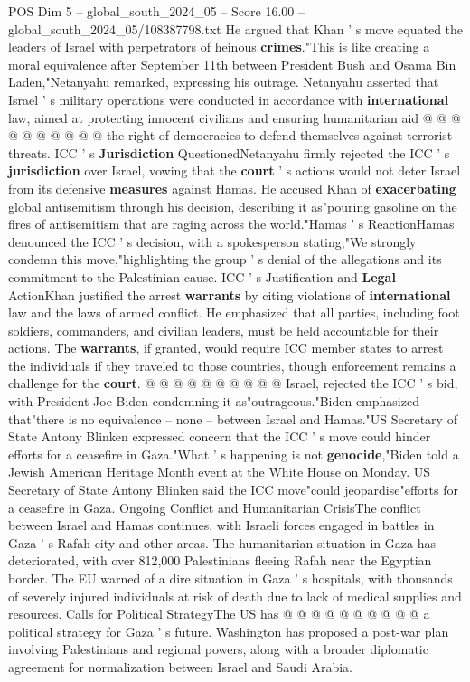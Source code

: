 \begin{textsample}{POS Dim 5 – global\_south\_2024\_05 – Score 16.00 – global\_south\_2024\_05/108387798.txt}
He argued that Khan ' s move equated the leaders of Israel with perpetrators of heinous \textbf{crimes}."This is like creating a moral equivalence after September 11th between President Bush and Osama Bin Laden,"Netanyahu remarked, expressing his outrage.
Netanyahu asserted that Israel ' s military operations were conducted in accordance with \textbf{international} law, aimed at protecting innocent civilians and ensuring humanitarian aid @ @ @ @ @ @ @ @ @ @ the right of democracies to defend themselves against terrorist threats.
ICC ' s \textbf{Jurisdiction} QuestionedNetanyahu firmly rejected the ICC ' s \textbf{jurisdiction} over Israel, vowing that the \textbf{court} ' s actions would not deter Israel from its defensive \textbf{measures} against Hamas.
He accused Khan of \textbf{exacerbating} global antisemitism through his decision, describing it as"pouring gasoline on the fires of antisemitism that are raging across the world."Hamas ' s ReactionHamas denounced the ICC ' s decision, with a spokesperson stating,"We strongly condemn this move,"highlighting the group ' s denial of the allegations and its commitment to the Palestinian cause.
ICC ' s Justification and \textbf{Legal} ActionKhan justified the arrest \textbf{warrants} by citing violations of \textbf{international} law and the laws of armed conflict.
He emphasized that all parties, including foot soldiers, commanders, and civilian leaders, must be held accountable for their actions.
The \textbf{warrants}, if granted, would require ICC member states to arrest the individuals if they traveled to those countries, though enforcement remains a challenge for the \textbf{court}. @ @ @ @ @ @ @ @ @ @ Israel, rejected the ICC ' s bid, with President Joe Biden condemning it as"outrageous."Biden emphasized that"there is no equivalence -- none -- between Israel and Hamas."US Secretary of State Antony Blinken expressed concern that the ICC ' s move could hinder efforts for a ceasefire in Gaza."What ' s happening is not \textbf{genocide},"Biden told a Jewish American Heritage Month event at the White House on Monday.
US Secretary of State Antony Blinken said the ICC move"could jeopardise"efforts for a ceasefire in Gaza.
Ongoing Conflict and Humanitarian CrisisThe conflict between Israel and Hamas continues, with Israeli forces engaged in battles in Gaza ' s Rafah city and other areas.
The humanitarian situation in Gaza has deteriorated, with over 812,000 Palestinians fleeing Rafah near the Egyptian border.
The EU warned of a dire situation in Gaza ' s hospitals, with thousands of severely injured individuals at risk of death due to lack of medical supplies and resources.
Calls for Political StrategyThe US has @ @ @ @ @ @ @ @ @ @ a political strategy for Gaza ' s future.
Washington has proposed a post-war plan involving Palestinians and regional powers, along with a broader diplomatic agreement for normalization between Israel and Saudi Arabia.

\end{textsample}
